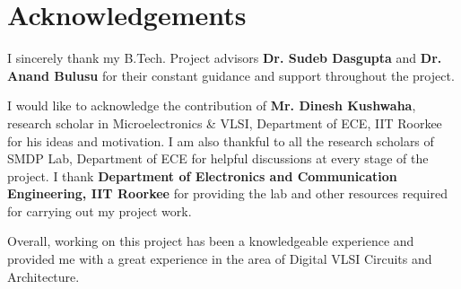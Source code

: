 %
%

\chapter*{Acknowledgements}
\begin{OnehalfSpacing}
\initial I sincerely thank my B.Tech. Project advisors \textbf{Dr. Sudeb Dasgupta} and \textbf{Dr. Anand Bulusu} for their constant guidance and support throughout the project. 

I would like to acknowledge the contribution of \textbf{Mr. Dinesh Kushwaha}, research scholar in Microelectronics \& VLSI, Department of ECE, IIT Roorkee for his ideas and motivation. I am also thankful to all the research scholars of SMDP Lab, Department of ECE for helpful discussions at every stage of the project. I thank \textbf{Department of Electronics and Communication Engineering, IIT Roorkee} for providing the lab and other resources required for carrying out my project work. 

Overall, working on this project has been a knowledgeable experience and provided me with a great experience in the area of Digital VLSI Circuits and Architecture. 


\end{OnehalfSpacing}
\clearpage
